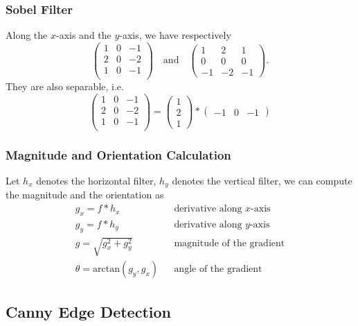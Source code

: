 \documentclass[twocolumn,landscape,10pt]{article}
\theoremstyle{definition}
\begin{document}
\subsubsection{Sobel Filter}

Along the $x$-axis and the $y$-axis, we have respectively
\[
    \begin{pmatrix}
        1 & 0 & -1 \\
        2 & 0 & -2 \\
        1 & 0 & -1 \\
    \end{pmatrix} 
    \quad\text{and}\quad
    \begin{pmatrix}
        1 & 2 & 1 \\
        0 & 0 & 0 \\
        -1 & -2 & -1
    \end{pmatrix}.
\]
They are also separable, i.e.\
\[
    \begin{pmatrix}
        1 & 0 & -1 \\
        2 & 0 & -2 \\
        1 & 0 & -1 \\
    \end{pmatrix} 
    =
    \begin{pmatrix}
        1 \\
        2 \\ 
        1
    \end{pmatrix} 
    *
    \begin{pmatrix}
        -1 & 0 & -1
    \end{pmatrix} 
\]

\subsubsection{Magnitude and Orientation Calculation}

Let $h_x$ denotes the horizontal filter, $h_y$ denotes the vertical filter,
we can compute the magnitude and the orientation as
\begin{align*}
    g_x=f*h_x && \text{derivative along $x$-axis} \\
    g_y=f*h_y & &\text{derivative along $y$-axis} \\
    g = \sqrt{g_x^2+g_y^2} && \text{magnitude of the gradient} \\
    \theta = \text{arctan}{(g_y,g_x)} && \text{angle of the gradient}
\end{align*}

\subsection{Canny Edge Detection}
\end{document}
